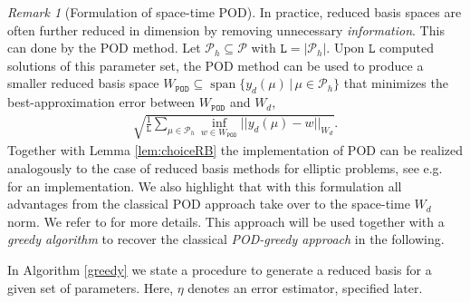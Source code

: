 \documentclass{article}
\theoremstyle{plain}
\theoremstyle{definition}
\theoremstyle{remark}
\newtheorem{remark}[theorem]{Remark}
\DeclareMathOperator{\Span}{span}
\begin{document}
\begin{remark}[Formulation of space-time POD]\label{rem:POD} In practice, reduced basis spaces are often further reduced in dimension by removing unnecessary \textit{information}. This can done by the POD method. Let $\mathcal{P}_h \subseteq \mathcal{P}$ with $\texttt{L} = \vert \mathcal{P}_h \vert$. Upon $\texttt{L}$ computed solutions of this parameter set, the POD method can be used to produce a smaller reduced basis space $W_{\texttt{POD}} \subseteq  \Span{\lbrace y_d(\mu) \, \vert \, \mu \in \mathcal{P}_h\rbrace}$ that minimizes the best-approximation error between $W_\texttt{POD}$ and $W_d$,
\begin{align}
    \sqrt{\frac{1}{\texttt{L}} \sum_{\mu \in \mathcal{P}_h}\underset{w \in W_{\texttt{POD}}}{\inf} \vert \vert y_d(\mu)-w\vert\vert_{W_d}}.
\end{align}
Together with Lemma \ref{lem:choiceRB} the implementation of POD can be realized analogously to the case of reduced basis methods for elliptic problems, see e.g.~\cite[p.~33]{Hesthaven2016} for an implementation. We also highlight that with this formulation all advantages from the classical POD approach take over to the space-time $W_d$ norm. We refer to \cites[§~3.2.1]{Hesthaven2016}[§~2.4.5]{haasdonk2017reduced}{GräßleHinzeVolkwein+2021+47+96} for more details. This approach will be used together with a \textit{greedy algorithm} to recover the classical \textit{POD-greedy approach} \cites[Def.~2.92]{haasdonk2017reduced}[§~6.1.2]{Hesthaven2016} in the following.
\end{remark}

In Algorithm \ref{greedy} we state a procedure to generate a reduced basis for a given set of parameters. Here, $\eta$ denotes an error estimator, specified later.
\end{document}
